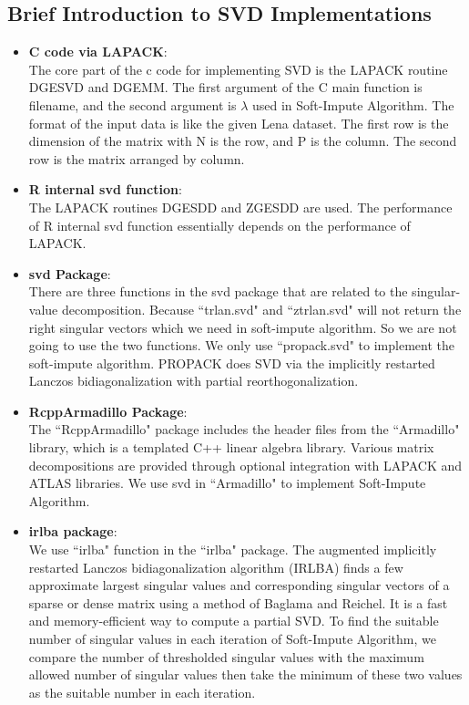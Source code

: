 \documentclass[12pt]{article}
\begin{document}
\subsection{Brief Introduction to SVD Implementations}
\begin{itemize}
	\item \textbf{C code via LAPACK}:\\
	The core part of the c code for implementing SVD is the LAPACK routine DGESVD and DGEMM. The first argument of the C main function is filename, and the second argument is $\lambda$ used in Soft-Impute Algorithm. The format of the input data is like the given Lena dataset. The first row is the dimension of the matrix with N is the row, and P is the column. The second row is the matrix arranged by column.
		\item \textbf{R internal svd function}: \\
	The LAPACK routines DGESDD and ZGESDD are used. The performance of R internal svd function essentially depends on the performance of LAPACK.
	\item \textbf{svd Package}: \\
	There are three functions in the svd package that are related to the singular-value decomposition. Because ``trlan.svd" and ``ztrlan.svd" will not return the right singular vectors which we need in soft-impute algorithm. So we are not going to use the two functions. We only use ``propack.svd" to implement the soft-impute algorithm. PROPACK does SVD via the implicitly restarted Lanczos bidiagonalization with partial reorthogonalization.
	\item \textbf{RcppArmadillo Package}: \\	
	The ``RcppArmadillo" package includes the header files from the ``Armadillo" library, which is a templated C++ linear algebra library. Various matrix decompositions are provided through optional integration with LAPACK and ATLAS libraries.  We use svd in ``Armadillo" to implement Soft-Impute Algorithm.
	\item \textbf{irlba package}: \\
	We use ``irlba" function in the ``irlba" package. The augmented implicitly restarted Lanczos bidiagonalization algorithm (IRLBA) finds a few approximate largest singular values and corresponding singular vectors of a sparse or dense matrix using a method of Baglama and Reichel. It is a fast and memory-efficient way to compute a partial SVD.
	To find the suitable number of singular values in each iteration of Soft-Impute Algorithm, we compare the number of thresholded singular values with the maximum allowed number of singular values then take the minimum of these two values as the suitable number in each iteration.
\end{itemize}
\end{document}
